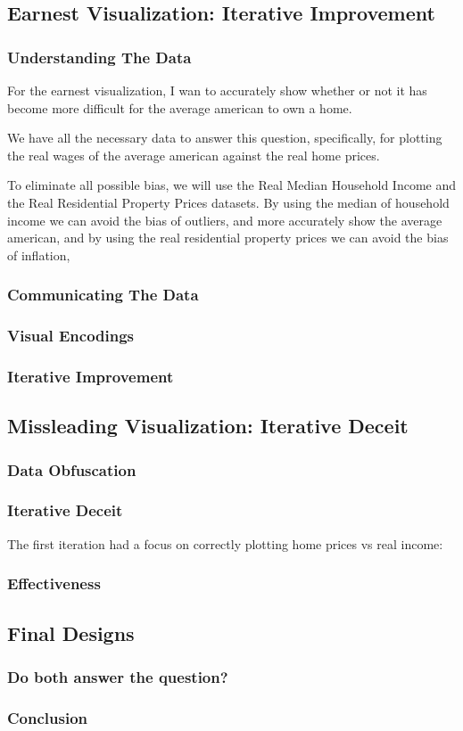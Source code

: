 \documentclass{article}
\begin{document}
\subsection{Earnest Visualization: Iterative Improvement}
\subsubsection{Understanding The Data}

For the earnest visualization, I wan to accurately show whether or not it has become
more difficult for the average american to own a home. 

We have all the necessary data to answer this question, specifically, for plotting the
real wages of the average american against the real home prices.

To eliminate all possible bias, we will use the Real Median Household Income 
and the Real Residential Property Prices datasets. By using the median of household income
we can avoid the bias of outliers, and more accurately show the average american, 
and by using the real residential property prices we can avoid the bias of inflation,

\subsubsection{Communicating The Data}
\subsubsection{Visual Encodings}
\subsubsection{Iterative Improvement}

\subsection{Missleading Visualization: Iterative Deceit}
\subsubsection{Data Obfuscation}
\subsubsection{Iterative Deceit}
The first iteration had a focus on correctly plotting home prices vs real income:
\subsubsection{Effectiveness}

\subsection{Final Designs}
\subsubsection{Do both answer the question?}
\subsubsection{Conclusion}

\newpage
\begin{refcontext}[sorting=nyt]
\printbibliography
\end{refcontext}
\end{document}
